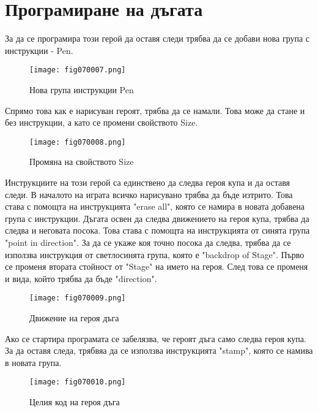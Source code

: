 \section{Програмиране на дъгата}
За да се програмира този герой да оставя следи трябва да се добави нова група с инструкции - Pen.

\begin{figure}[H]
  \centering
  \texttt{[image: fig070007.png]}
  \caption{Нова група инструкции Pen}
\label{fig070007}
\end{figure}

Спрямо това как е нарисуван героят, трябва да се намали. Това може да стане и без инструкции, а като се промени свойството Size.

\begin{figure}[H]
  \centering
  \texttt{[image: fig070008.png]}
  \caption{Промяна на свойството Size}
\label{fig070008}
\end{figure}

Инструкциите на този герой са единствено да следва героя купа и да оставя следи. В началото на играта всичко нарисувано трябва да бъде изтрито. Това става с помощта на инструкцията "erase all", която се намира в новата добавена група с инструкции. Дъгата освен да следва движението на героя купа, трябва да следва и неговата посока. Това става с помощта на инструкцията от синята група "point in direction". За да се укаже коя точно посока да следва, трябва да се използва инструкция от светлосинята група, която е "backdrop of Stage". Първо се променя втората стойност от "Stage" на името на героя. След това се променя и вида, който трябва да бъде "direction".

\begin{figure}[H]
  \centering
  \texttt{[image: fig070009.png]}
  \caption{Движение на героя дъга}
\label{fig070009}
\end{figure}

Ако се стартира програмата се забелязва, че героят дъга само следва героя купа. За да оставя следа, трябвяа да се използва инструкцията "stamp", която се намива в новата група.

\begin{figure}[H]
  \centering
  \texttt{[image: fig070010.png]}
  \caption{Целия код на героя дъга}
\label{fig070010}
\end{figure}

